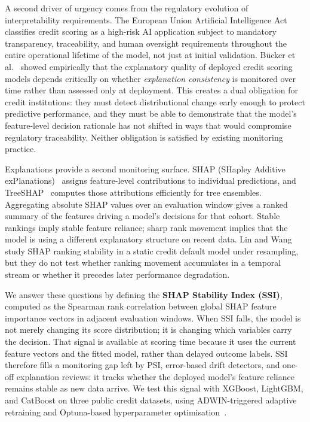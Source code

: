 \documentclass[pdflatex,sn-mathphys-num]{sn-jnl}
\theoremstyle{thmstyleone}
\theoremstyle{thmstyletwo}
\theoremstyle{thmstylethree}
\begin{document}
A second driver of urgency comes from the regulatory evolution of
interpretability requirements. The European Union Artificial Intelligence
Act~\cite{eu_ai_act2024} classifies credit scoring as a high-risk AI
application subject to mandatory transparency, traceability, and human
oversight requirements throughout the entire operational lifetime of the
model, not just at initial validation. B\"{u}cker et
al.~\cite{bucker2022transparency} showed empirically that the explanatory
quality of deployed credit scoring models depends critically on whether
\emph{explanation consistency} is monitored over time rather than assessed
only at deployment. This creates a dual obligation for credit institutions:
they must detect distributional change early enough to protect predictive
performance, and they must be able to demonstrate that the model's
feature-level decision rationale has not shifted in ways that would compromise
regulatory traceability. Neither obligation is satisfied by existing monitoring
practice.

Explanations provide a second monitoring surface. SHAP (SHapley Additive
exPlanations)~\cite{lundberg2017shap} assigns feature-level contributions to
individual predictions, and TreeSHAP~\cite{lundberg2020trees} computes those
attributions efficiently for tree ensembles. Aggregating absolute SHAP values
over an evaluation window gives a ranked summary of the features driving a
model's decisions for that cohort. Stable rankings imply stable feature
reliance; sharp rank movement implies that the model is using a different
explanatory structure on recent data. Lin and Wang~\cite{lin2025shap} study
SHAP ranking stability in a static credit default model under resampling, but
they do not test whether ranking movement accumulates in a temporal stream or
whether it precedes later performance degradation.

We answer these questions by defining the \textbf{SHAP Stability Index
(SSI)}, computed as the Spearman rank correlation between global SHAP feature
importance vectors in adjacent evaluation windows. When SSI falls, the model is
not merely changing its score distribution; it is changing which variables carry
the decision. That signal is available at scoring time because it uses the
current feature vectors and the fitted model, rather than delayed outcome
labels. SSI therefore fills a monitoring gap left by PSI, error-based drift
detectors, and one-off explanation reviews: it tracks whether the deployed
model's feature reliance remains stable as new data arrive. We test this signal
with XGBoost, LightGBM, and CatBoost on three public credit datasets, using
ADWIN-triggered adaptive retraining and Optuna-based hyperparameter
optimisation~\cite{akiba2019optuna}.
\end{document}
